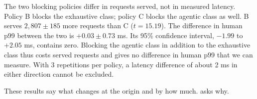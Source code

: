 The two blocking policies differ in requests served, not in measured latency.
Policy B blocks the exhaustive class; policy C blocks the agentic class as
well.
B serves $2{,}807 \pm 185$ more requests than C ($t = 15.19$).
The difference in human p99 between the two is $+0.03 \pm 0.73$ ms.
Its 95\% confidence interval, $-1.99$ to $+2.05$ ms, contains zero.
Blocking the agentic class in addition to the exhaustive class thus costs served
requests and gives no difference in human p99 that we can
measure.
With 3 repetitions per policy, a latency difference of about 2 ms in either direction
cannot be excluded.

These results say what changes at the origin and by how much.
 asks why.
